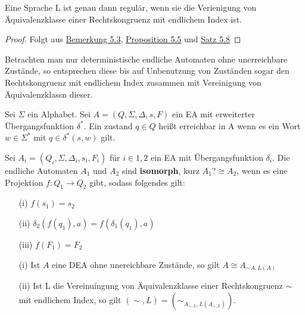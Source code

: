  Eine Sprache L ist genau dann regulär, wenn sie die Verienigung von Äquivalenzklasse einer Rechtskongruenz mit endlichem Index ist. 
\begin{proof}
  Folgt aus \hyperref[subsec:5.3]{Bemerkung 5.3}, \hyperref[subsec:5.5]{Proposition 5.5} und \hyperref[subsec:5.8]{Satz 5.8}
\end{proof}
Betrachten man nur deterministische endliche Automaten ohne unerreichbare Zustände, so entsprechen diese bis auf Unbenutzung von Zuständen sogar den Rechtskongruenz mit endlichem Index zusammen mit Vereinigung von Äquivalenzklassn dieser.

 Sei $\Sigma$ ein Alphabet. Sei $A = (Q, \Sigma, \Delta, s, F)$ ein EA mit erweiterter Übergangsfunktion $\delta^{*}$. Ein zustand $q\in Q$ heißt erreichbar in A wenn es ein Wort $w \in \Sigma ^{*}$ mit $q\in \delta^{*}(s, w)$ gilt.

 Sei $A_{i} = (Q_{i}, \Sigma, \Delta_{i}, s_{i}, F_{i})$ für $i \in {1,2}$ ein EA mit Übergangsfunktion $\delta_{i}$. Die endliche Automaten $A_{1}$ und $A_{2}$ sind \textbf{isomorph}, kurz $A_{1}? \cong A_{2}$, wenn es eine Projektion $f:Q_{1}\rightarrow Q_{2}$ gibt, sodass folgendes gilt:
\begin{itemize}
    \item [(i)] $f(s_{1}) = s_{2}$
    \item [(ii)] $\delta_{2}(f(q_{1}), a) = f(\delta_{1}(q_{1}), a)$
    \item [(iii)] $f(F_1) = F_2$
\end{itemize}

\begin{itemize}
  \item [(i)] Ist $A$ eine DEA ohne unereichbare Zustände, so gilt $A \cong A_{\sim A, L(A)}$
  \item [(ii)] Ist L die Vereinuíngung von Äquivalenzklasse einer Rechtskongruenz $\sim$ mit endlichem Index, so gilt $(\sim, L) = (\sim_{A_{\sim, L}, L(A_{\sim, L})})$.
\end{itemize}

